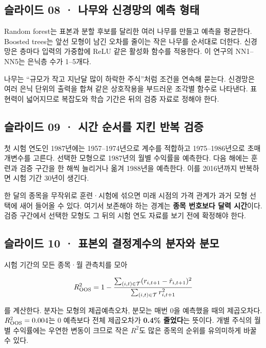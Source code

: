 \documentclass[11pt,a4paper]{article}
\begin{document}
\subsection{슬라이드 08 · 나무와 신경망의 예측 형태}
Random forest는 표본과 분할 후보를 달리한 여러 나무를 만들고 예측을 평균한다. Boosted trees는 앞선 모형이 남긴 오차를 줄이는 작은 나무를 순서대로 더한다. 신경망은 층마다 입력의 가중합에 ReLU 같은 활성화 함수를 적용한다. 이 연구의 NN1–NN5는 은닉층 수가 1–5개다.\par

나무는 “규모가 작고 지난달 많이 하락한 주식”처럼 조건을 연속해 묻는다. 신경망은 여러 은닉 단위의 출력을 합쳐 같은 상호작용을 부드러운 조각별 함수로 나타낸다. 표현력이 넓어지므로 복잡도와 학습 기간은 뒤의 검증 자료로 정해야 한다.\par

\subsection{슬라이드 09 · 시간 순서를 지킨 반복 검증}
첫 시험 연도인 1987년에는 1957–1974년으로 계수를 적합하고 1975–1986년으로 초매개변수를 고른다. 선택한 모형으로 1987년의 월별 수익률을 예측한다. 다음 해에는 훈련과 검증 구간을 한 해씩 늘리거나 옮겨 1988년을 예측한다. 이를 2016년까지 반복하면 시험 기간 30년이 생긴다.\par

한 달의 종목을 무작위로 훈련·시험에 섞으면 미래 시점의 가격 관계가 과거 모형 선택에 새어 들어올 수 있다. 여기서 보존해야 하는 경계는 \textbf{종목 번호보다 달력 시간}이다. 검증 구간에서 선택한 모형도 그 뒤의 시험 연도 자료를 보기 전에 확정해야 한다.\par

\subsection{슬라이드 10 · 표본외 결정계수의 분자와 분모}
시험 기간의 모든 종목·월 관측치를 모아\par

\[
R^2_{\rm OOS}=1-\frac{\sum_{(i,t)\in\mathcal T}(r_{i,t+1}-\hat r_{i,t+1})^2}{\sum_{(i,t)\in\mathcal T}r_{i,t+1}^2}
\]

를 계산한다. 분자는 모형의 제곱예측오차, 분모는 매번 0을 예측했을 때의 제곱오차다. $R^2_{\rm OOS}=0.004$는 0 예측보다 전체 제곱오차가 \textbf{0.4\% 줄었다}는 뜻이다. 개별 주식의 월별 수익률에는 우연한 변동이 크므로 작은 $R^2$도 많은 종목의 순위를 유의미하게 바꿀 수 있다.\par
\end{document}

